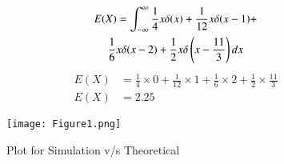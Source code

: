 \documentclass[journal,12pt,twocolumn]{IEEEtran}
\begin{document}
\begin{multline}
    E(X) = \int_{-\infty}^{\infty}\frac{1}{4}x\delta(x) + \frac{1}{12}x\delta(x - 1) +\\ \frac{1}{6}x\delta(x-2) + \frac{1}{2}x\delta\left(x-\frac{11}{3}\right)dx
\end{multline}
\begin{align}
    E(X) &= {\frac{1}{4}}\times 0 + {\frac{1}{12}}\times 1 + {\frac{1}{6}}\times 2 + {\frac{1}{2}}\times{\frac{11}{3}}\\
    E(X) &= 2.25
\end{align}
\begin{figure}[hb]
    \centering
    \texttt{[image: Figure1.png]}
    \caption{Plot for Simulation v/s Theoretical}
    \label{fig:plot}
\end{figure}
\end{document}
